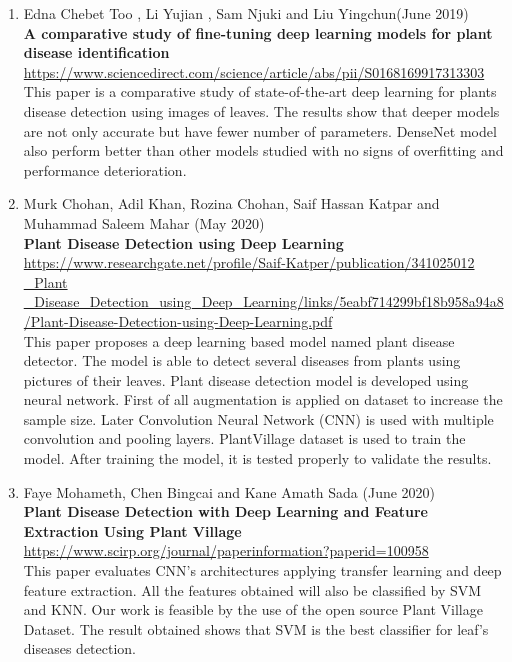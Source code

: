 \begin{enumerate}
    \item Edna Chebet Too , Li Yujian , Sam Njuki and Liu Yingchun(June 2019) \\
        \textbf{A comparative study of fine-tuning deep learning models for plant disease identification} \\
        \href{https://www.sciencedirect.com/science/article/abs/pii/S0168169917313303}{https://www.sciencedirect.com/science/article/abs/pii/S0168169917313303} \\
        This paper is a comparative study of state-of-the-art deep learning for plants disease detection using images of leaves. The results show that deeper models are not only accurate but have fewer number of parameters. DenseNet model also perform better than other models studied with no signs of overfitting and performance deterioration.\\

    \item Murk Chohan, Adil Khan, Rozina Chohan, Saif Hassan Katpar and Muhammad Saleem Mahar (May 2020) \\
        \textbf{Plant Disease Detection using Deep Learning} \\
        \href{https://www.researchgate.net/profile/Saif-Katper/publication/341025012_Plant_Disease_Detection_using_Deep_Learning/links/5eabf714299bf18b958a94a8/Plant-Disease-Detection-using-Deep-Learning.pdf}
        {https://www.researchgate.net/profile/Saif-Katper/publication/341025012 \_Plant \_Disease\_Detection\_using\_Deep\_Learning/links/5eabf714299bf18b958a94a8/Plant-Disease-Detection-using-Deep-Learning.pdf} \\
        This paper proposes a deep learning based model named plant disease detector. The model is able to detect several diseases from plants using pictures of their leaves. Plant disease detection model is developed using neural network. First of all augmentation is applied on dataset to increase the sample size. Later Convolution Neural Network (CNN) is used with multiple convolution and pooling layers. PlantVillage dataset is used to train the model. After training the model, it is tested properly to validate the results.

    \item Faye Mohameth, Chen Bingcai and Kane Amath Sada (June 2020) \\
        \textbf{Plant Disease Detection with Deep Learning and Feature Extraction Using Plant Village} \\
        \href{https://www.scirp.org/journal/paperinformation?paperid=100958}{https://www.scirp.org/journal/paperinformation?paperid=100958} \\
        This paper evaluates CNN’s architectures applying transfer learning and deep feature extraction. All the features obtained will also be classified by SVM and KNN. Our work is feasible by the use of the open source Plant Village Dataset. The result obtained shows that SVM is the best classifier for leaf’s diseases detection.
    

\end{enumerate}
